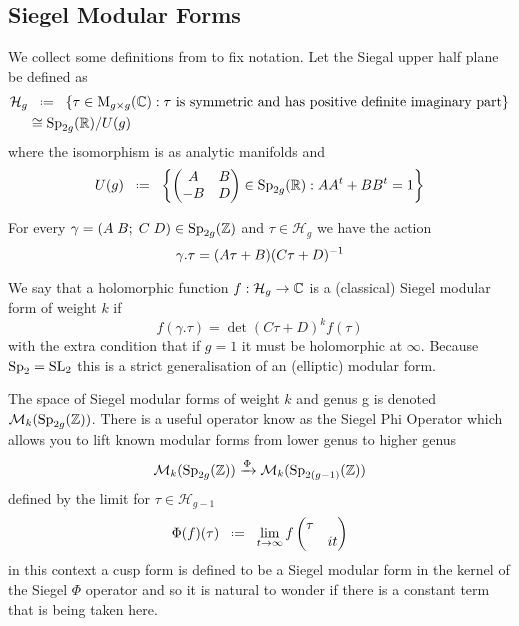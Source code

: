 \subsection{Siegel Modular Forms}
We collect some definitions from \cite{bruinier123ModularForms2008} to fix notation. Let the Siegal upper half plane be defined as 
\begin{equation*}
	\begin{aligned}
		\mathcal{H}_g &\defeq \{\tau \in \mathrm{M}_{g\times g}(\C) : \tau \text{ is symmetric and has positive definite imaginary part}\} \\
		& \cong \Sp_{2g}(\R) / U(g)
	\end{aligned}
\end{equation*}
where the isomorphism is as analytic manifolds  and 
\[U(g) \defeq \left\{\begin{pmatrix}
	A & B\\
	-B & D
\end{pmatrix}\in \Sp_{2g}(\R) : AA^t + BB^t = 1\right\}\]

For every \(\gamma= (A \; B; \; C\; D) \in \Sp_{2g}(\Z)\) and \(\tau \in \mathcal{H}_g\) we have the action
\[\gamma.\tau = (A\tau + B)(C\tau + D)^{-1} \]

We say that a holomorphic function \(f: \mathcal{H}_g \to \C\) is a (classical) Siegel modular form of weight \(k\) if 
\[f(\gamma.\tau) = \det(C\tau + D)^kf(\tau)\]
with the extra condition that if \(g = 1\) it must be holomorphic at \(\infty\). Because \(\operatorname{Sp}_2 = \operatorname{SL}_2\) this is a strict generalisation of an (elliptic) modular form.

The space of Siegel modular forms of weight \(k\) and genus g is denoted \(\mathcal{M}_k(\Sp_{2g}(\Z))\). There is a useful operator know as the Siegel Phi Operator which allows you to lift known modular forms from lower genus to higher genus \cite[5]{bruinier123ModularForms2008}
\[\mathcal{M}_k(\Sp_{2g}(\Z)) \xrightarrow{\Phi} \mathcal{M}_{k}(\Sp_{2(g-1)}(\Z))\]
defined by the limit for \(\tau\in \mathcal{H}_{g-1}\)
\[\Phi(f)(\tau) \defeq \lim_{t\to \infty} f\begin{pmatrix}
	\tau & \\
	& it 
\end{pmatrix}\]
in this context a cusp form is defined to be a Siegel modular form in the kernel of the Siegel \(\Phi\) operator and so it is natural to wonder if there is a constant term that is being taken here. 

